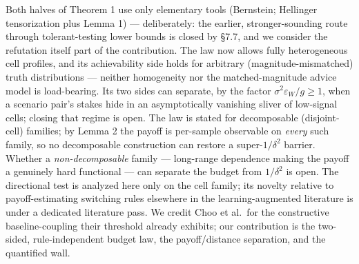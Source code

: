 Both halves of Theorem 1 use only elementary tools (Bernstein; Hellinger
tensorization plus Lemma 1) --- deliberately: the earlier,
stronger-sounding route through tolerant-testing lower bounds is closed
by §7.7, and we consider the refutation itself part of the contribution.
The law now allows fully heterogeneous cell profiles, and its
achievability side holds for arbitrary (magnitude-mismatched) truth
distributions --- neither homogeneity nor the matched-magnitude advice
model is load-bearing. Its two sides can separate, by the factor
\(\sigma^2\varepsilon_W/g \ge 1\), when a scenario pair's stakes hide in
an asymptotically vanishing sliver of low-signal cells; closing that
regime is open. The law is stated for decomposable (disjoint-cell)
families; by Lemma 2 the payoff is per-sample observable on \emph{every}
such family, so no decomposable construction can restore a
super-\(1/\delta^2\) barrier. Whether a \emph{non-decomposable} family
--- long-range dependence making the payoff a genuinely hard functional
--- can separate the budget from \(1/\delta^2\) is open. The directional
test is analyzed here only on the cell family; its novelty relative to
payoff-estimating switching rules elsewhere in the learning-augmented
literature is under a dedicated literature pass. We credit Choo et
al.~for the constructive baseline-coupling their threshold already
exhibits; our contribution is the two-sided, rule-independent budget
law, the payoff/distance separation, and the quantified wall.
